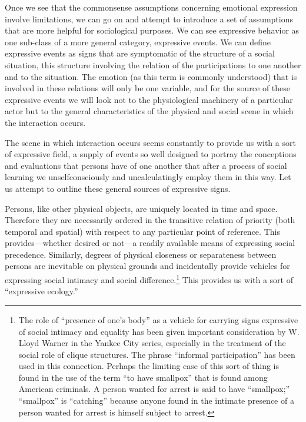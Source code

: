 \documentclass[twoside,symmetric,nobib,justified]{tufte-book}
\begin{document}
\noindent Once we see that the commonsense assumptions concerning emotional
expression involve limitations, we can go on and attempt to introduce a
set of assumptions that are more helpful for sociological purposes. We
can see expressive behavior as one sub-class of a more general category,
expressive events. We can define expressive events as signs that are
symptomatic of the structure of a social situation, this structure
involving the relation of the participations to one another and to the
situation. The emotion (as this term is commonly understood) that is
involved in these relations will only be one variable, and for the
source of these expressive events we will look not to the physiological
machinery of a particular actor but to the general characteristics of
the physical and social scene in which the interaction occurs.

The scene in which interaction occurs seems constantly to provide us
with a sort of expressive field, a supply of events so well designed to
portray the conceptions and evaluations that persons have of one another
that after a process of social learning we unselfconsciously and
uncalculatingly employ them in this way. Let us attempt to outline these
general sources of expressive signs.

Persons, like other physical objects, are uniquely located in time and
space. Therefore they are necessarily ordered in the transitive relation
of priority (both temporal and spatial) with respect to any particular
point of reference. This provides---whether desired or not---a readily
available means of expressing social precedence. Similarly, degrees of
physical closeness or separateness between persons are inevitable on
physical grounds and incidentally provide vehicles for expressing social
intimacy and social difference.\footnote{The role of ``presence of one's
  body'' as a vehicle for carrying signs expressive of social intimacy
  and equality has been given important consideration by W. Lloyd Warner
  in the Yankee City series, especially in the treatment of the social
  role of clique structures. The phrase ``informal participation'' has
  been used in this connection. Perhaps the limiting case of this sort
  of thing is found in the use of the term ``to have smallpox'' that is
  found among American criminals. A person wanted for arrest is said to
  have ``smallpox;'' ``smallpox'' is ``catching'' because anyone found
  in the intimate presence of a person wanted for arrest is himself
  subject to arrest.} This provides us with a sort of ``expressive
ecology.''
\end{document}
